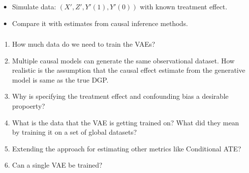 \documentclass{beamer}
\begin{document}
\begin{frame}
\begin{columns}
\begin{column}{0.2\textwidth}
\begin{figure}[t]
			\end{figure}
		\end{column}
	\end{columns}
	\begin{itemize}
		\item Simulate data: $ (X', Z', Y'(1), Y'(0)) $ with known treatment effect.
		\item Compare it with estimates from causal inference methods.
	\end{itemize}
\end{frame}

\begin{frame}
	\frametitle{}
	\begin{enumerate}
		\item How much data do we need to train the VAEs?
		\item Multiple causal models can generate the same
			observational dataset. How realistic is the assumption
			that the causal effect estimate from the generative
			model is same as the true DGP.
		\item Why is specifying the treatment effect and confounding
			bias a desirable propoerty?
		\item What is the data that the VAE is getting trained on? What
			did they mean by training it on a set of global
			datasets?
		\item Extending the approach for estimating other metrics like
			Conditional ATE?
		\item Can a single VAE be trained?
	\end{enumerate}
\end{frame}
\end{document}

